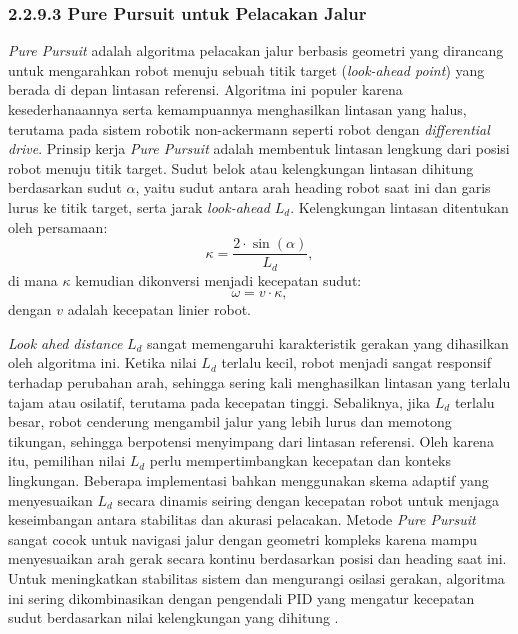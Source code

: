 \subsubsection{2.2.9.3 Pure Pursuit untuk Pelacakan Jalur}

\emph{Pure Pursuit} adalah algoritma pelacakan jalur berbasis geometri yang dirancang untuk mengarahkan robot menuju sebuah titik target (\emph{look-ahead point}) yang berada di depan lintasan referensi. Algoritma ini populer karena kesederhanaannya serta kemampuannya menghasilkan lintasan yang halus, terutama pada sistem robotik non-ackermann seperti robot dengan \emph{differential drive}. Prinsip kerja \emph{Pure Pursuit} adalah membentuk lintasan lengkung dari posisi robot menuju titik target. Sudut belok atau kelengkungan lintasan dihitung berdasarkan sudut \( \alpha \), yaitu sudut antara arah heading robot saat ini dan garis lurus ke titik target, serta jarak \emph{look-ahead} \(L_d\). Kelengkungan lintasan ditentukan oleh persamaan:
\begin{equation}
    \kappa = \frac{2 \cdot \sin(\alpha)}{L_d},
\end{equation}
di mana \( \kappa \) kemudian dikonversi menjadi kecepatan sudut:
\begin{equation}
    \omega = v \cdot \kappa,
\end{equation}
dengan \( v \) adalah kecepatan linier robot.

\emph{Look ahed distance} \(L_d\) sangat memengaruhi karakteristik gerakan yang dihasilkan oleh algoritma ini. Ketika nilai \(L_d\) terlalu kecil, robot menjadi sangat responsif terhadap perubahan arah, sehingga sering kali menghasilkan lintasan yang terlalu tajam atau osilatif, terutama pada kecepatan tinggi. Sebaliknya, jika \(L_d\) terlalu besar, robot cenderung mengambil jalur yang lebih lurus dan memotong tikungan, sehingga berpotensi menyimpang dari lintasan referensi. Oleh karena itu, pemilihan nilai \(L_d\) perlu mempertimbangkan kecepatan dan konteks lingkungan. Beberapa implementasi bahkan menggunakan skema adaptif yang menyesuaikan \(L_d\) secara dinamis seiring dengan kecepatan robot untuk menjaga keseimbangan antara stabilitas dan akurasi pelacakan. Metode \emph{Pure Pursuit} sangat cocok untuk navigasi jalur dengan geometri kompleks karena mampu menyesuaikan arah gerak secara kontinu berdasarkan posisi dan heading saat ini. Untuk meningkatkan stabilitas sistem dan mengurangi osilasi gerakan, algoritma ini sering dikombinasikan dengan pengendali PID yang mengatur kecepatan sudut berdasarkan nilai kelengkungan yang dihitung \cite{coulter1992implementation}.


